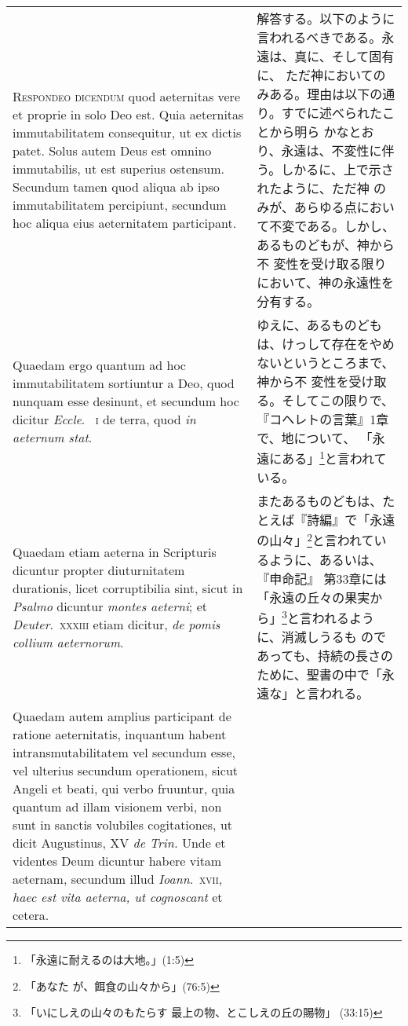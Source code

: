 \documentclass[10pt]{jsarticle} %
\begin{document}
\begin{longtable}{p{21em}p{21em}}
\\

{\scshape Respondeo dicendum} quod aeternitas vere et proprie in solo Deo est. Quia
aeternitas immutabilitatem consequitur, ut ex dictis patet. Solus autem
Deus est omnino immutabilis, ut est superius ostensum. 
Secundum tamen quod aliqua ab ipso immutabilitatem percipiunt, secundum
hoc aliqua eius aeternitatem participant.

&

解答する。以下のように言われるべきである。永遠は、真に、そして固有に、
ただ神においてのみある。理由は以下の通り。すでに述べられたことから明ら
かなとおり、永遠は、不変性に伴う。しかるに、上で示されたように、ただ神
のみが、あらゆる点において不変である。しかし、あるものどもが、神から不
変性を受け取る限りにおいて、神の永遠性を分有する。

\\

Quaedam ergo quantum ad hoc immutabilitatem sortiuntur a Deo, quod
nunquam esse desinunt, et secundum hoc dicitur {\it Eccle}.~{\scshape
i} de terra, quod {\itshape in aeternum stat}.

&

ゆえに、あるものどもは、けっして存在をやめないというところまで、神から不
変性を受け取る。そしてこの限りで、『コヘレトの言葉』1章で、地について、
「永遠にある」\footnote{「永遠に耐えるのは大地。」(1:5)}と言われている。

\\

Quaedam etiam aeterna in Scripturis dicuntur propter diuturnitatem
durationis, licet corruptibilia sint, sicut in {\it Psalmo} dicuntur
{\itshape montes aeterni}; et {\it Deuter}.~{\scshape xxxiii} etiam dicitur, {\itshape de
pomis collium aeternorum}.

&

またあるものどもは、たとえば『詩編』で「永遠の山々」\footnote{「あなた
が、餌食の山々から」(76:5)}と言われているように、あるいは、『申命記』
第33章には「永遠の丘々の果実から」\footnote{「いにしえの山々のもたらす
最上の物、とこしえの丘の賜物」 (33:15)}と言われるように、消滅しうるも
のであっても、持続の長さのために、聖書の中で「永遠な」と言われる。

\\

Quaedam autem amplius participant de ratione aeternitatis, inquantum
habent intransmutabilitatem vel secundum esse, vel ulterius secundum
operationem, sicut Angeli et beati, qui verbo fruuntur, quia quantum ad
illam visionem verbi, non sunt in sanctis volubiles cogitationes, ut
dicit Augustinus, XV {\it de Trin.} Unde et videntes Deum dicuntur
habere vitam aeternam, secundum illud {\it Ioann}.~{\scshape xvii}, {\itshape haec
est vita aeterna, ut cognoscant} et cetera.


\end{longtable}
\end{document}
